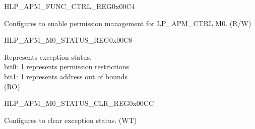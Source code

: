 \begin{register}{H}{LP\_APM\_FUNC\_CTRL\_REG}{0x00C4}\label{regdesc:LPAPMFUNCCTRLREG}
%
%
\regnewline%
\begin{regdesc}\begin{reglist}
\label{fielddesc:LPAPMM0FUNCEN}\item [LP\_APM\_M0\_FUNC\_EN] Configures to enable permission management for LP\_APM\_CTRL M0. (R/W)
\end{reglist}\end{regdesc}
\end{register}

\begin{register}{H}{LP\_APM\_M0\_STATUS\_REG}{0x00C8}\label{regdesc:LPAPMM0STATUSREG}
%
%
\regnewline%
\begin{regdesc}\begin{reglist}
\label{fielddesc:LPAPMM0EXCEPTIONSTATUS}\item [LP\_APM\_M0\_EXCEPTION\_STATUS] Represents exception status.\\ 
bit0: 1 represents permission restrictions \\ 
bit1: 1 represents address out of bounds  \\ 
(RO)
\end{reglist}\end{regdesc}
\end{register}


\begin{register}{H}{LP\_APM\_M0\_STATUS\_CLR\_REG}{0x00CC}\label{regdesc:LPAPMM0STATUSCLRREG}
%
%
\regnewline%
\begin{regdesc}\begin{reglist}
\label{fielddesc:LPAPMM0REGIONSTATUSCLR}\item [LP\_APM\_M0\_REGION\_STATUS\_CLR] Configures to clear exception status. (WT)
\end{reglist}\end{regdesc}
\end{register}


